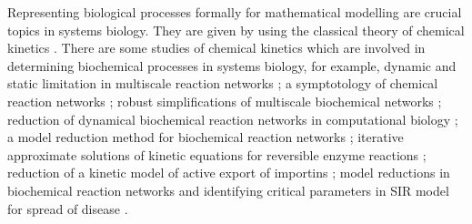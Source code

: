 \documentclass[a4paper,12pt]{article}
\begin{document}
 Representing biological processes formally for mathematical modelling are crucial topics in systems biology. They are given by using the classical theory of chemical kinetics \cite{brigs1925, semenoff1939, segel1989}. There are some studies of chemical kinetics which are involved in determining biochemical processes in systems biology, for example, dynamic and static limitation in multiscale reaction networks \cite{gorbanredul2008}; a symptotology of chemical reaction networks \cite{gorbanraduzin2010}; robust simplifications of multiscale biochemical networks \cite{radulescugorzi2008}; reduction of dynamical biochemical reaction networks in computational biology \cite{radulescugorzi2012}; a model reduction method for biochemical reaction networks \cite{rao2014}; iterative approximate solutions of kinetic equations for reversible enzyme reactions \cite{khoshnaw2013}; reduction of a kinetic model of active export of importins \cite{khoshnaw2015a}; model reductions in biochemical reaction networks \cite{khoshnaw2015b} and identifying critical parameters in SIR model for
spread of disease \cite{khoshnaw2017}.\\  
 
\end{document}
